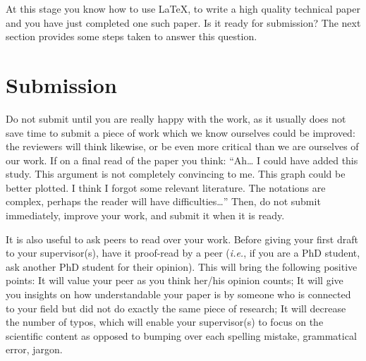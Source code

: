 \documentclass[authoryear,12pta4paper,fleqn]{article}
\newcommand{\ie}{\textit{i.e.},\xspace}
\numberwithin{equation}{section}
\theoremstyle{remark}
\begin{document}
\begin{figure}[!h]
  \begin{snippetlatex}[caption={Writing two-column papers using \LaTeX.},label={snippet_two_cols},framerule=1pt,tabsize=3]
    \usepackage{mathtools, cuted} %

    \begin{figure}[!h]
    \end{figure}

    \begin{table}[!h]
    \end{table}
   
    \begin{strip}
    \end{strip}
  \end{snippetlatex}
\end{figure}

At this stage you know how to use \LaTeX, to write a high quality technical paper and you have just completed one such paper. Is it ready for submission? The next section provides some steps taken to answer this question. 


\section{Submission}\label{sec:submission}

Do not submit until you are really happy with the work, as it usually does not save time to submit a piece of work which we know ourselves could be improved: the reviewers will think likewise, or be even more critical than we are ourselves of our work. If on a final read of the paper you think: “Ah… I could have added this study. This argument is not completely convincing to me. This graph could be better plotted. I think I forgot some relevant literature. The notations are complex, perhaps the reader will have difficulties…” Then, do not submit immediately, improve your work, and submit it when it is ready. 

It is also useful to ask peers to read over your work. Before giving your first draft to your supervisor(s), have it proof-read by a peer (\ie if you are a PhD student, ask another PhD student for their opinion). This will bring the following positive points: 
It will value your peer as you think her/his opinion counts;
It will give you insights on how understandable your paper is by someone who is connected to your field but did not do exactly the same piece of research;
It will decrease the number of typos, which will enable your supervisor(s) to focus on the scientific content as opposed to bumping over each spelling mistake, grammatical error, jargon. 
\end{document}
